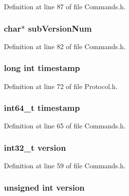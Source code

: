 Definition at line 87 of file Commands.h.

\hypertarget{struct_cmd_version_abe98c3c041a6acda8de5e4052aff3ccd}{
\subsubsection[{subVersionNum}]{\setlength{\rightskip}{0pt plus 5cm}char$\ast$ {\bf subVersionNum}}}
\label{struct_cmd_version_abe98c3c041a6acda8de5e4052aff3ccd}


Definition at line 82 of file Commands.h.

\hypertarget{struct_cmd_version_ac402a8520447a72d85baad30fb7d66af}{
\subsubsection[{timestamp}]{\setlength{\rightskip}{0pt plus 5cm}long int {\bf timestamp}}}
\label{struct_cmd_version_ac402a8520447a72d85baad30fb7d66af}


Definition at line 72 of file Protocol.h.

\hypertarget{struct_cmd_version_a8a591d341723df9496cda98e225b25b4}{
\subsubsection[{timestamp}]{\setlength{\rightskip}{0pt plus 5cm}int64\_\-t {\bf timestamp}}}
\label{struct_cmd_version_a8a591d341723df9496cda98e225b25b4}


Definition at line 65 of file Commands.h.

\hypertarget{struct_cmd_version_a67fae7dd1de9edce3656ed214d20377f}{
\subsubsection[{version}]{\setlength{\rightskip}{0pt plus 5cm}int32\_\-t {\bf version}}}
\label{struct_cmd_version_a67fae7dd1de9edce3656ed214d20377f}


Definition at line 59 of file Commands.h.

\hypertarget{struct_cmd_version_a5408ac5df4c170828874e1b10b4c35a0}{
\subsubsection[{version}]{\setlength{\rightskip}{0pt plus 5cm}unsigned int {\bf version}}}
\label{struct_cmd_version_a5408ac5df4c170828874e1b10b4c35a0}


